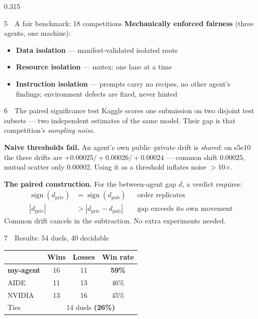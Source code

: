 \documentclass[final]{beamer}
\newcommand{\highlight}[1]{\textcolor{accent}{\textbf{#1}}}
\begin{document}
\begin{frame}[t]
\begin{columns}[t]
\begin{column}{0.315\textwidth}
\begin{block}{5~~A fair benchmark: 18 competitions}
\vspace{0.6ex}
\textbf{Mechanically enforced fairness} (three agents, one machine):
\begin{itemize}
  \item \textbf{Data isolation} --- manifest-validated isolated roots
  \item \textbf{Resource isolation} --- mutex: one lane at a time
  \item \textbf{Instruction isolation} --- prompts carry no recipes, no other agent's findings; environment defects are fixed, never hinted
\end{itemize}
\end{block}

\begin{block}{6~~The paired significance test}
Kaggle scores one submission on two disjoint test subsets --- two independent estimates of the same model. Their gap is that competition's \emph{sampling noise}.

\vspace{0.6ex}
\textbf{Naive thresholds fail.} An agent's own public--private drift is \emph{shared}: on s5e10 the three drifts are $+0.00025/+0.00026/+0.00024$ --- common shift $0.00025$, mutual scatter only $\mathbf{0.00002}$. Using it as a threshold inflates noise $>$10$\times$.

\vspace{0.6ex}
\textbf{The paired construction.} For the between-agent gap $d$, a verdict requires:
\begin{align*}
\operatorname{sign}(d_{\text{priv}}) &= \operatorname{sign}(d_{\text{pub}}) && \text{order replicates}\\
|d_{\text{priv}}| &> |d_{\text{priv}} - d_{\text{pub}}| && \text{gap exceeds its own movement}
\end{align*}
Common drift cancels in the subtraction. No extra experiments needed.
\end{block}

\begin{block}{7~~Results: 54 duels, 40 decidable}
\centering
\begin{tabular}{@{}lccc@{}}
\toprule
 & \textbf{Wins} & \textbf{Losses} & \textbf{Win rate} \\
\midrule
\textbf{my-agent} & 16 & 11 & \highlight{59\%} \\
AIDE & 11 & 13 & 46\% \\
NVIDIA & 13 & 16 & 45\% \\
\midrule
Ties & \multicolumn{3}{c}{14 duels \highlight{(26\%)}} \\
\bottomrule
\end{tabular}


\end{block}
\end{column}
\end{columns}
\end{frame}
\end{document}

